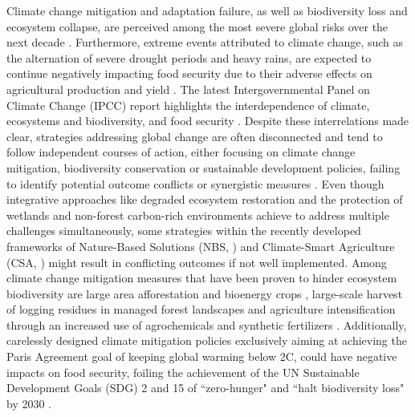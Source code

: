 Climate change mitigation and adaptation failure, as well as biodiversity loss and ecosystem collapse, are perceived among the most severe global risks over the next decade \citep{worldeconomicforum.2023}. Furthermore, extreme events attributed to climate change, such as the alternation of severe drought periods and heavy rains, are expected to continue negatively impacting food security due to their adverse effects on agricultural production and yield \citep{fao2022}. The latest Intergovernmental Panel on Climate Change (IPCC) report highlights the interdependence of climate, ecosystems and biodiversity, and food security \citep{IPCC2023}. Despite these interrelations made clear, strategies addressing global change are often disconnected and tend to follow independent courses of action, either focusing on climate change mitigation, biodiversity conservation or sustainable development policies, failing to identify potential outcome conflicts or synergistic measures \citep{arneth2020, rusch2022}. Even though integrative approaches like degraded ecosystem restoration \citep{strassburg2020, temperton2019} and the protection of wetlands and non-forest carbon-rich environments \citep{smith2022} achieve to address multiple challenges simultaneously, some strategies within the recently developed frameworks of Nature-Based Solutions (NBS, \cite{seddon2019}) and Climate-Smart Agriculture (CSA, \cite{tripathi2022}) might result in conflicting outcomes if not well implemented. Among climate change mitigation measures that have been proven to hinder ecosystem biodiversity are large area afforestation \citep{veldman2015} and bioenergy crops \citep{hof2018}, large-scale harvest of logging residues in managed forest landscapes \citep{felton2016} and agriculture intensification through an increased use of agrochemicals and synthetic fertilizers \citep{cohen2021}. Additionally, carelessly designed climate mitigation policies exclusively aiming at achieving the Paris Agreement goal of keeping global warming below 2\degree C, could have negative impacts on food security, foiling the achievement of the UN Sustainable Development Goals (SDG) 2 and 15 of “zero-hunger" and “halt biodiversity loss" by 2030 \citep{fujimori2019}.\\

